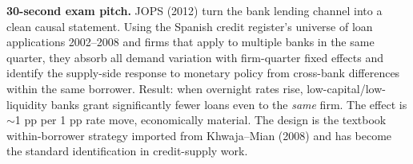 \documentclass[11pt]{article}
\begin{document}
\begin{keybox}
\textbf{30-second exam pitch.} JOPS (2012) turn the bank lending channel into a clean causal statement. Using the Spanish credit register's universe of loan applications 2002--2008 and firms that apply to multiple banks in the same quarter, they absorb all demand variation with firm-quarter fixed effects and identify the supply-side response to monetary policy from cross-bank differences within the same borrower. Result: when overnight rates rise, low-capital/low-liquidity banks grant significantly fewer loans even to the \emph{same} firm. The effect is $\sim$1 pp per 1 pp rate move, economically material. The design is the textbook within-borrower strategy imported from Khwaja--Mian (2008) and has become the standard identification in credit-supply work.
\end{keybox}
\end{document}

